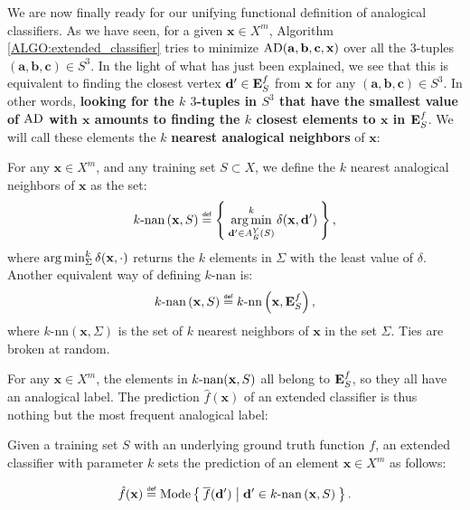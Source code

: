 We are now finally ready for our unifying functional definition of analogical
classifiers. As we have seen, for a given $\mathbf{x} \in X^m$, Algorithm
\ref{ALGO:extended_classifier} tries to minimize
$\text{AD}(\mathbf{a},\mathbf{b},\mathbf{c},\mathbf{x})$ over all the $3$-tuples
$(\mathbf{a},\mathbf{b},\mathbf{c}) \in S^3$. In the light of what has just
been explained, we see that this is equivalent to finding the closest vertex
$\mathbf{d}' \in \mathbf{E}_{S}^{f}$ from $\mathbf{x}$ for any $(\mathbf{a}, \mathbf{b},
\mathbf{c}) \in S^3$. In other words, \textbf{looking for the $k$ $3$-tuples in
$S^3$ that have the smallest value of $\text{AD}$ with $\mathbf{x}$ amounts to
finding the $k$ closest elements to $\mathbf{x}$ in $\mathbf{E}_{S}^{f}$}. We will call these
elements the $k$ \textbf{nearest analogical neighbors} of $\mathbf{x}$:

\begin{definition}
  \label{DEF:knan}
  For any $\mathbf{x} \in X^m$, and any training set $S \subset X$, we define
  the $k$ nearest analogical neighbors of $\mathbf{x}$ as the set:
  $$k\text{-nan}\left(\mathbf{x}, S\right) \eqdef \Set{\argmin_{\mathbf{d}' \in
  A_E^Y(S)}^k
  \delta(\mathbf{x},\mathbf{d}')},
  $$
  where $\operatorname*{arg\,min}_{\Sigma}^k \delta(\mathbf{x}, \cdot)$ returns the $k$ elements in $\Sigma$
  with the least value of $\delta$.
  Another equivalent way of defining $k\text{-nan}$ is:
  $$k\text{-nan}\left(\mathbf{x}, S\right) \eqdef k\text{-nn}\left(\mathbf{x},
  \esf\right),$$
  where $k\text{-nn}\left(\mathbf{x},\Sigma\right)$ is the set of $k$ nearest
  neighbors of $\mathbf{x}$ in the set $\Sigma$. Ties are broken at random.
\end{definition}

For any $\mathbf{x} \in X^m$, the elements in $k\text{-nan}(\mathbf{x}, S)$ all belong
to $\mathbf{E}_{S}^{f}$, so they all have an analogical label. The prediction
$\hat{f}(\mathbf{x})$ of an extended classifier is thus nothing but the most
frequent analogical label:

\begin{definition}
  \label{DEF:extended_classifier}
  Given a training set $S$ with an underlying ground truth function $f$,
  an extended classifier with parameter $k$ sets the prediction of an element
  $\mathbf{x} \in X^m$ as follows:

  $$\hat{f}(\mathbf{x}) \eqdef \text{Mode}\Set{\albl{\mathbf{d}'} | \mathbf{d}'
  \in k\text{-nan}\left(\mathbf{x}, S\right)}.
  $$
\end{definition}

